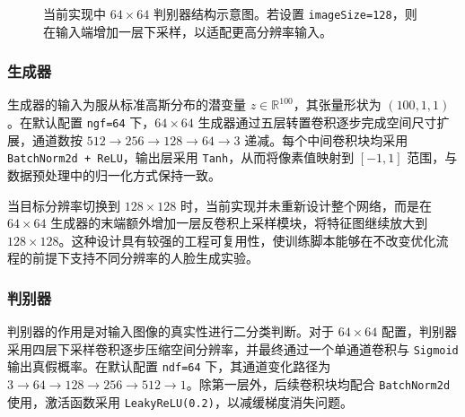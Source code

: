 \documentclass[12pt, a4paper, UTF8]{ctexart}
\begin{document}
\begin{figure}[H]
\centering
{}
\caption{当前实现中 $64\times64$ 判别器结构示意图。若设置 \texttt{imageSize=128}，则在输入端增加一层下采样，以适配更高分辨率输入。}
\end{figure}

\subsubsection{生成器}

生成器的输入为服从标准高斯分布的潜变量 $z\in\mathbb{R}^{100}$，其张量形状为 $(100,1,1)$。在默认配置 \verb|ngf=64| 下，$64\times64$ 生成器通过五层转置卷积逐步完成空间尺寸扩展，通道数按 $512 \rightarrow 256 \rightarrow 128 \rightarrow 64 \rightarrow 3$ 递减。每个中间卷积块均采用 \verb|BatchNorm2d + ReLU|，输出层采用 \verb|Tanh|，从而将像素值映射到 $[-1,1]$ 范围，与数据预处理中的归一化方式保持一致。

当目标分辨率切换到 $128\times128$ 时，当前实现并未重新设计整个网络，而是在 $64\times64$ 生成器的末端额外增加一层反卷积上采样模块，将特征图继续放大到 $128\times128$。这种设计具有较强的工程可复用性，使训练脚本能够在不改变优化流程的前提下支持不同分辨率的人脸生成实验。

\subsubsection{判别器}

判别器的作用是对输入图像的真实性进行二分类判断。对于 $64\times64$ 配置，判别器采用四层下采样卷积逐步压缩空间分辨率，并最终通过一个单通道卷积与 \verb|Sigmoid| 输出真假概率。在默认配置 \verb|ndf=64| 下，其通道变化路径为 $3 \rightarrow 64 \rightarrow 128 \rightarrow 256 \rightarrow 512 \rightarrow 1$。除第一层外，后续卷积块均配合 \verb|BatchNorm2d| 使用，激活函数采用 \verb|LeakyReLU(0.2)|，以减缓梯度消失问题。
\end{document}
